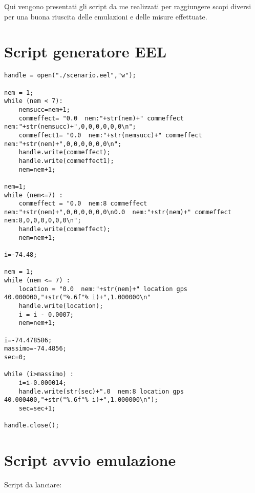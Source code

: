 Qui vengono presentati gli script da me realizzati per raggiungere scopi diversi per una buona riuscita delle emulazioni e delle misure effettuate.

\section{Script generatore EEL}
\label{app:script_eel_generator}

\lstset{language=PYTHON}
\begin{lstlisting}
handle = open("./scenario.eel","w");

nem = 1;
while (nem < 7):
	nemsucc=nem+1;
	commeffect= "0.0  nem:"+str(nem)+" commeffect nem:"+str(nemsucc)+",0,0,0,0,0,0\n";
	commeffect1= "0.0  nem:"+str(nemsucc)+" commeffect nem:"+str(nem)+",0,0,0,0,0,0\n";
	handle.write(commeffect);
	handle.write(commeffect1);
	nem=nem+1;

nem=1;
while (nem<=7) :
	commeffect = "0.0  nem:8 commeffect nem:"+str(nem)+",0,0,0,0,0,0\n0.0  nem:"+str(nem)+" commeffect nem:8,0,0,0,0,0,0\n";
	handle.write(commeffect);
	nem=nem+1;

i=-74.48;

nem = 1;
while (nem <= 7) :
	location = "0.0  nem:"+str(nem)+" location gps 40.000000,"+str("%.6f"% i)+",1.000000\n"
	handle.write(location);
	i = i - 0.0007;
	nem=nem+1;

i=-74.478586;
massimo=-74.4856;
sec=0;

while (i>massimo) :
	i=i-0.000014;
	handle.write(str(sec)+".0  nem:8 location gps 40.000400,"+str("%.6f"% i)+",1.000000\n");
	sec=sec+1;

handle.close();
\end{lstlisting}

\section{Script avvio emulazione}
\label{app:script_avvio}

Script da lanciare:

